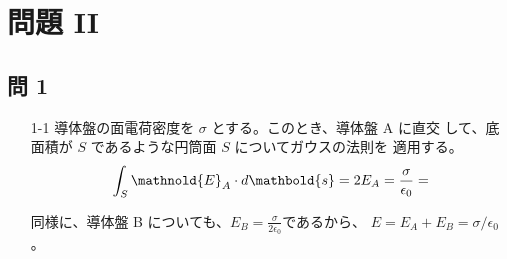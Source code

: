 \documentclass[report]{dennou777}
\begin{document}
\section{問題 II}

\subsection{問 1}
\begin{itemize}
	\item[1-1]
		導体盤の面電荷密度を $\sigma$ とする。このとき、導体盤 A に直交
		して、底面積が $S$ であるような円筒面 $S$ についてガウスの法則を
		適用する。
		\[\int_S\mathnold{E}_A\cdot d\mathbold{s}=2E_A=\frac{\sigma}{\epsilon_0}=\]

		同様に、導体盤 B についても、$E_B=\frac{\sigma}{2\epsilon_0}$であるから、
		$E=E_A+E_B=\sigma/\epsilon_0$。
\end{itemize}
\end{document}
